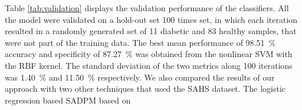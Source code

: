 \documentclass[journal,comsoc]{IEEEtran}
\renewcommand{\^}{\hat}  %
\begin{document}
Table \ref{tab:validation} displays the validation performance of the classifiers. All the model were validated on a hold-out set \num{100} times set, in which each iteration resulted in a randomly generated set of \num{11} diabetic and \num{83} healthy samples, that were not part of the training data. The best mean performance of \SI{98.51}{\percent} accuracy and  specificity of \SI{87.27}{\percent} was obtained from the nonlinear SVM with the RBF kernel. The standard deviation of the two metrics along \num{100} iterations was \SI{1.40}{\percent} and \SI{11.50}{\percent} respectively. We also compared the results of our approach with two other techniques that used the SAHS dataset. The logistic regression based SADPM based on
%
%
%
\end{document}
